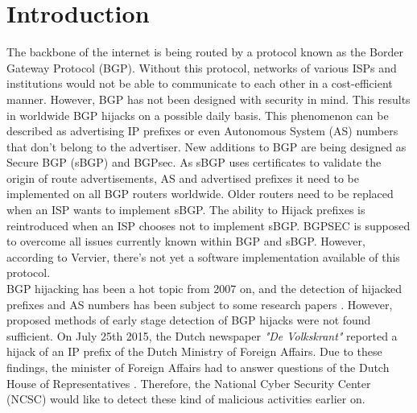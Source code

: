 \section{Introduction}
The backbone of the internet is being routed by a protocol known as the Border Gateway Protocol (BGP). Without this protocol, networks of various ISPs and institutions would not be able to communicate to each other in a cost-efficient manner. However, BGP has not been designed with security in mind. This results in worldwide BGP hijacks on a possible daily basis. This phenomenon can be described as advertising IP prefixes or even Autonomous System (AS) numbers that don't belong to the advertiser. New additions to BGP are being designed as Secure BGP (sBGP) and BGPsec. As sBGP uses certificates to validate the origin of route advertisements, AS and advertised prefixes it need to be implemented on all BGP routers worldwide. Older routers need to be replaced when an ISP wants to implement sBGP. The ability to Hijack prefixes is reintroduced when an ISP chooses not to implement sBGP.  BGPSEC is supposed to overcome all issues currently known within BGP and sBGP. However, according to Vervier, there's not yet a software implementation available of this protocol\cite{vervier2015mind}.\\

BGP hijacking has been a hot topic from 2007 on, and the detection of hijacked prefixes and AS numbers has been subject to some research papers \cite{hu2007accurate}\cite{zheng2007light}. However, proposed methods of early stage detection of BGP hijacks were not found sufficient. On July 25th 2015, the Dutch newspaper \textit{"De Volkskrant"} reported a hijack of an IP prefix of the Dutch Ministry of Foreign Affairs. Due to these findings, the minister of Foreign Affairs had to answer questions of the Dutch House of Representatives \cite{koenders2015response}. Therefore, the National Cyber Security Center (NCSC) would like to detect these kind of malicious activities earlier on.
